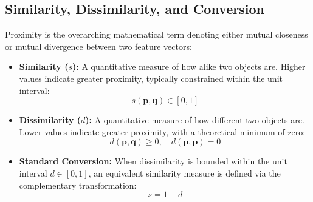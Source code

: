 \subsection{Similarity, Dissimilarity, and Conversion}
Proximity is the overarching mathematical term denoting either mutual closeness or mutual divergence between two feature vectors:
\begin{itemize}
    \item \textbf{Similarity ($s$):} A quantitative measure of how alike two objects are. Higher values indicate greater proximity, typically constrained within the unit interval:
    \begin{equation}
        s(\mathbf{p}, \mathbf{q}) \in [0, 1]
    \end{equation}
    \item \textbf{Dissimilarity ($d$):} A quantitative measure of how different two objects are. Lower values indicate greater proximity, with a theoretical minimum of zero:
    \begin{equation}
        d(\mathbf{p}, \mathbf{q}) \ge 0, \quad d(\mathbf{p}, \mathbf{p}) = 0
    \end{equation}
    \item \textbf{Standard Conversion:} When dissimilarity is bounded within the unit interval $d \in [0, 1]$, an equivalent similarity measure is defined via the complementary transformation:
    \begin{equation}
        s = 1 - d
    \end{equation}
\end{itemize}

